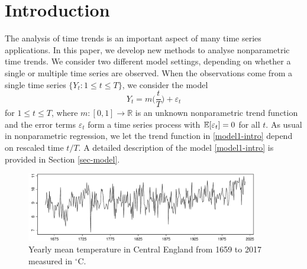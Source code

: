 
\section{Introduction}\label{sec-intro}


The analysis of time trends is an important aspect of many time series applications. In this paper, we develop new methods to analyse nonparametric time trends. 
We consider two different model settings, depending on whether a single or multiple time series are observed. When the observations come from a single time series $\{ Y_t: 1 \le t \le T \}$, we consider the model
\begin{equation}\label{model1-intro}
Y_t = m \Big( \frac{t}{T} \Big) + \varepsilon_t
\end{equation}
for $1 \le t \le T$, where $m: [0,1] \rightarrow \mathbb{R}$ is an unknown nonparametric trend function and the error terms $\varepsilon_t$ form a time series process with $\mathbb{E}[\varepsilon_t] = 0$ for all $t$. As usual in nonparametric regression, we let the trend function in \eqref{model1-intro} depend on rescaled time $t/T$. A detailed description of the model \eqref{model1-intro} is provided in Section \ref{sec-model}.


\begin{figure}
\centering
\includegraphics[width=0.9\textwidth]{Plots/temperature_data.pdf}
\vspace{0.15cm}

\caption{Yearly mean temperature in Central England from 1659 to 2017 measured in $^\circ$C.}\label{yearly_data}
\vspace{-0.15cm}
\end{figure}


